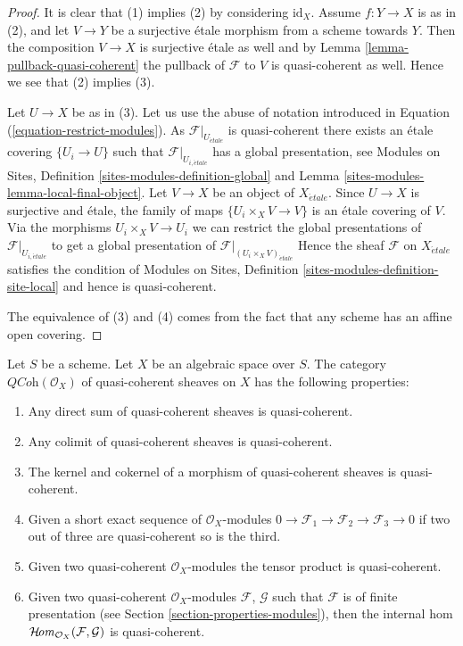 \begin{proof}
It is clear that (1) implies (2) by considering $\text{id}_X$.
Assume $f : Y \to X$ is as in (2), and let $V \to Y$ be a surjective
\'etale morphism from a scheme towards $Y$. Then the composition $V \to X$ is
surjective \'etale as well
and by Lemma \ref{lemma-pullback-quasi-coherent} the pullback of $\mathcal{F}$
to $V$ is quasi-coherent as well. Hence we see that (2) implies (3).

\medskip\noindent
Let $U \to X$ be as in (3). Let us use the abuse of notation introduced
in Equation (\ref{equation-restrict-modules}).
As $\mathcal{F}|_{U_{\acute{e}tale}}$ is quasi-coherent there exists an
\'etale covering $\{U_i \to U\}$ such that
$\mathcal{F}|_{U_{i, \acute{e}tale}}$ has a global presentation, see
Modules on Sites, Definition \ref{sites-modules-definition-global} and
Lemma \ref{sites-modules-lemma-local-final-object}.
Let $V \to X$ be an object of $X_{\acute{e}tale}$. Since $U \to X$ is
surjective and \'etale, the family of maps $\{U_i \times_X V \to V\}$ is an
\'etale covering
of $V$. Via the morphisms $U_i \times_X V \to U_i$ we can restrict the
global presentations of $\mathcal{F}|_{U_{i, \acute{e}tale}}$ to get a global
presentation of $\mathcal{F}|_{(U_i \times_X V)_{\acute{e}tale}}$
Hence the sheaf $\mathcal{F}$ on $X_{\acute{e}tale}$ satisfies the condition of
Modules on Sites, Definition \ref{sites-modules-definition-site-local}
and hence is quasi-coherent.

\medskip\noindent
The equivalence of (3) and (4) comes from the fact that any scheme has
an affine open covering.
\end{proof}

\begin{lemma}
\label{lemma-properties-quasi-coherent}
Let $S$ be a scheme. Let $X$ be an algebraic space over $S$.
The category $\textit{QCoh}(\mathcal{O}_X)$ of quasi-coherent sheaves on $X$ has
the following properties:
\begin{enumerate}
\item Any direct sum of quasi-coherent sheaves is quasi-coherent.
\item Any colimit of quasi-coherent sheaves is quasi-coherent.
\item The kernel and cokernel of a morphism of quasi-coherent sheaves
is quasi-coherent.
\item Given a short exact sequence of $\mathcal{O}_X$-modules
$0 \to \mathcal{F}_1 \to \mathcal{F}_2 \to \mathcal{F}_3 \to 0$
if two out of three are quasi-coherent so is the third.
\item Given two quasi-coherent $\mathcal{O}_X$-modules
the tensor product is quasi-coherent.
\item Given two quasi-coherent $\mathcal{O}_X$-modules
$\mathcal{F}$, $\mathcal{G}$ such that $\mathcal{F}$
is of finite presentation (see
Section \ref{section-properties-modules}),
then the internal hom
$\mathop{\mathcal{H}\!{\it om}}\nolimits_{\mathcal{O}_X}(\mathcal{F}, \mathcal{G})$
is quasi-coherent.
\end{enumerate}
\end{lemma}

